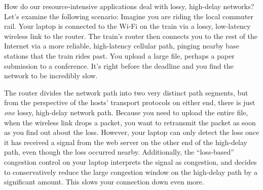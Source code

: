 


How do our resource-intensive applications deal with lossy, high-delay networks?
Let's examine the following scenario: Imagine you are riding the local commuter
rail. Your laptop is connected to the Wi-Fi on the train via a lossy,
low-latency wireless link to the router. The train's router then connects you
to the rest of the Internet via a more reliable, high-latency cellular path,
pinging nearby base stations that the train rides past. You upload a large file,
perhaps a paper submission to a conference. It's right before the deadline
and you find the network to be incredibly slow.

The router divides the network path into two very distinct path segments, but
from the perspective of the hosts' transport protocols on either end, there is
just \textit{one} lossy, high-delay network path. Because you need to upload
the entire file, when the wireless link drops a packet, you want to retransmit
the packet as soon as you find out about the loss. However, your laptop can
only detect the loss once it has received a signal from the web server on the
other end of the high-delay path, even though the loss occurred nearby.
Additionally, the ``loss-based'' congestion control on your laptop interprets
the signal as congestion, and decides to conservatively reduce the large
congestion window on the high-delay path by a significant amount. This slows
your connection down even more.

